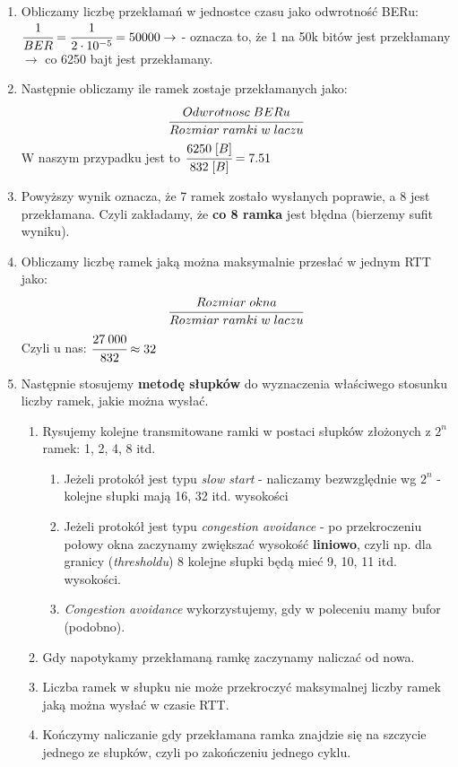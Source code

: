 			\begin{enumerate}
				\item Obliczamy liczbę przekłamań w jednostce czasu jako odwrotność BERu:
				$ \cfrac{1}{BER} = \cfrac{1}{2\cdot 10^{-5}}=50000 \rightarrow$ - oznacza to, że 1 na 50k bitów jest przekłamany $ \rightarrow $ co 6250 bajt jest przekłamany.
				\item Następnie obliczamy ile ramek zostaje przekłamanych jako:
				$$ \cfrac{Odwrotnosc\;BERu}{Rozmiar\;ramki\;w\;laczu} $$
				W naszym przypadku jest to $ \cfrac{6250\;[B]}{832\;[B]}=7.51$
				\item Powyższy wynik oznacza, że 7 ramek zostało wysłanych poprawie, a 8 jest przekłamana. Czyli zakładamy, że \textbf{co 8 ramka} jest błędna (bierzemy sufit wyniku).
				\item Obliczamy liczbę ramek jaką można maksymalnie przesłać w jednym RTT jako:
				$$ \cfrac{Rozmiar\;okna}{Rozmiar\;ramki\;w\;laczu} $$
				Czyli u nas: $ \cfrac{27\:000}{832}\approx32 $
				\item Następnie stosujemy \textbf{metodę słupków} do wyznaczenia właściwego stosunku liczby ramek, jakie można wysłać.
				\begin{enumerate}
					\item Rysujemy kolejne transmitowane ramki w postaci słupków złożonych z $ 2^n $ ramek: 1, 2, 4, 8 itd.
					\begin{enumerate}
						\item Jeżeli protokół jest typu \emph{slow start} - naliczamy bezwzględnie wg $ 2^n $ - kolejne słupki mają 16, 32 itd. wysokości
						\item Jeżeli protokół jest typu \emph{congestion avoidance} - po przekroczeniu połowy okna zaczynamy zwiększać wysokość \textbf{liniowo}, czyli np. dla granicy (\emph{thresholdu}) 8 kolejne słupki będą mieć 9, 10, 11 itd. wysokości.
						\item \emph{Congestion avoidance} wykorzystujemy, gdy w poleceniu mamy bufor (podobno).
					\end{enumerate}
					\item Gdy napotykamy przekłamaną ramkę zaczynamy naliczać od nowa.
					\item Liczba ramek w słupku nie może przekroczyć maksymalnej liczby ramek jaką można wysłać w czasie RTT.
					\item Kończymy naliczanie gdy przekłamana ramka znajdzie się na szczycie jednego ze słupków, czyli po zakończeniu jednego cyklu.
				\end{enumerate}

\end{enumerate}
